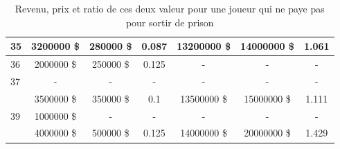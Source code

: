 \documentclass[letterpaper]{article}
\begin{document}
\begin{table}[h]
\begin{tabular}{|l|c|c|c||c|c|c|}
	  \cellcolor[HTML]{2E8B57} 35 & 3200000 \$ & 280000 \$ & 0.087 & 13200000 \$ & 14000000 \$ & 1.061 \\ \hline
	  \cellcolor[HTML]{E6E6FA} 36 & 2000000 \$ & 250000 \$ & 0.125 & - & - & - \\ \hline
	  \cellcolor[HTML]{FFC1C1} 37  & - & - & - & - & - & - \\ \hline
	  \cellcolor[HTML]{483D8B} \textcolor{white}{38} & 3500000 \$ & 350000 \$ & 0.1 & 13500000 \$ & 15000000 \$ & 1.111 \\ \hline
	  \cellcolor[HTML]{8B1A1A} 39  & 1000000 \$ & - & - & - & - & - \\ \hline
	  \cellcolor[HTML]{483D8B} \textcolor{white}{40} & 4000000 \$ & 500000 \$ & 0.125 & 14000000 \$ & 20000000 \$ & 1.429 \\ \hline
	\end{tabular}
	\caption{Revenu, prix et ratio de ces deux valeur pour une joueur qui ne paye pas pour sortir de prison}
	\label{table:rentabilite_paye_pas}
      \end{table}
      
\end{document}
